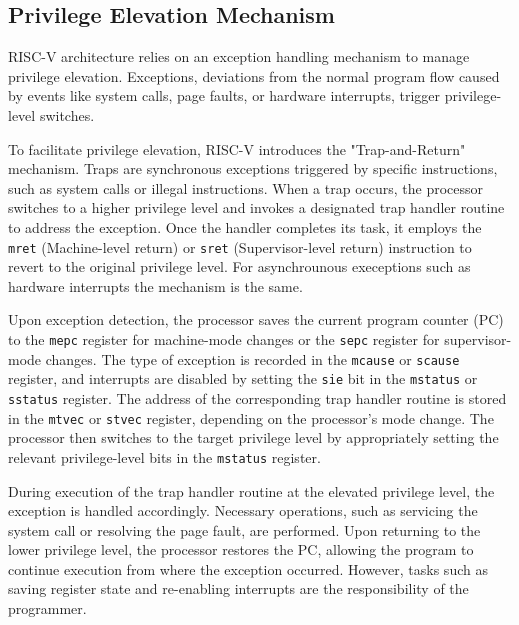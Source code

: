 \subsection{Privilege Elevation Mechanism}
RISC-V architecture relies on an exception handling mechanism to manage
privilege elevation. Exceptions, deviations from the normal program flow caused
by events like system calls, page faults, or hardware interrupts, trigger
privilege-level switches. \par
To facilitate privilege elevation, RISC-V introduces the "Trap-and-Return"
mechanism. Traps are synchronous exceptions triggered by specific instructions,
such as system calls or illegal instructions. When a trap occurs, the processor
switches to a higher privilege level and invokes a designated trap handler
routine to address the exception. Once the handler completes its task, it
employs the \texttt{mret} (Machine-level return) or \texttt{sret} (Supervisor-level return)
instruction to revert to the original privilege level. For asynchrounous
execeptions such as hardware interrupts the mechanism is the same.\par
Upon exception detection, the processor saves the current program counter (PC)
to the \texttt{mepc} register for machine-mode changes or the \texttt{sepc} register for
supervisor-mode changes. The type of exception is recorded in the \texttt{mcause} or
\texttt{scause} register, and interrupts are disabled by setting the \texttt{sie} bit in the
\texttt{mstatus} or \texttt{sstatus} register. The address of the corresponding trap handler routine is
stored in the \texttt{mtvec} or \texttt{stvec} register, depending on the processor's mode
change. The processor then switches to the target privilege level by
appropriately setting the relevant privilege-level bits in the \texttt{mstatus}
register.\par
During execution of the trap handler routine at the elevated privilege level,
the exception is handled accordingly. Necessary operations, such as servicing
the system call or resolving the page fault, are performed. Upon returning to
the lower privilege level, the processor restores the PC, allowing the program
to continue execution from where the exception occurred. However, tasks such as
saving register state and re-enabling interrupts are the responsibility of the
programmer.\par

